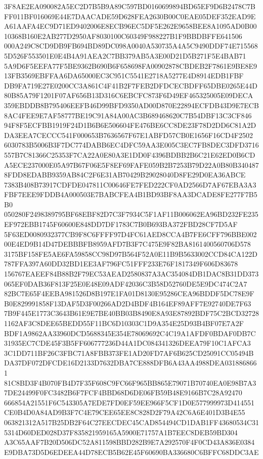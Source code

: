 \documentclass[UTF8,fontset=fandol,zihao=-4,a4paper]{ctexart}
\begin{document}
{{3F8AE2EA090082A5EC2D7B5B9A89C597BD0160699894BD65EF9D6B2478C7BFF011BF016069E44E7DAACADE59D628FEA2630B00C0EAE05DEF352EAD9E
A61AAFA4EC9D71ED9402006E8ECB96EC5DF5E262E9658BEE8A1095AD0B0010368B160E2AB277D2950AF8030100C60349F988227B1F9BBDBFFE641506
000A249C8CD9DB9FB694BD89DC098A0040A530735A4A5C9490DDF74E7155685D526F553501E0E4B4A91AEA2C7BB379AB5A3E00D21D5B271F5E4BAB71
5A9D6F5EEFA77F5BE9362B690B6F658698FA00902878CBDEB2F7861E9BE8E913FB3569EBFFAA6DA65000EC3C951C5541E2718A5277E4D8914EDB1FBF
DB9FA719E27E0200CC3A861C4F41B2F7FEB2DFDCECBDFF65DBE0265E44D80B85A79F1201F07AF656B13D316C6EBCFC873F6D49EF465325005E09DECA
359EBDDB8B795406EEFB46D99BFD9350AD00D870E22894ECFDB43D9E7ECB8AC4FEE9E7AF58777BE19C91A84A00AC3B689468620C7B54DBF13C3CF846
94F8F5ECFBB1919F24D1B6B6E506604FE476BE6CC8DE23F78D2DD6C81A2DDA3EEA7CECCC541F000653B7636567F67E1ABFD57CB0E1656F16CD4F2502
6030783B5006B3F7DC774DABB6EC4DFC59AA3E005C3EC7FB8DEC3DFD3716557B7C81366C25353F7CA22A0E80A3E1DD0F4396BDBB2B6C21E62ED0B6CD
A5ECE237000E05A97B67F06E5F8EF69FAFE059B2B7253B79D22A0B80B3404878FDD8EDABB9359AB84C2F6E31AB70429B29028040D8FE29D0EA36ABCE
7383B408B73917CDFDE047811C00646FE7FED222CF0AD2566D7AF67EBA3A3FBF7EEE9FDDB4A000503E7BABCFEA4B1BD93BF8AA3DCADE8FE277F7B5B0
050280F2498389795BF68EBF82D7C3F7934C5F1AF11B006062EA96BD232FE235EF972EBB1745F60600E848DD7DF1783C7B0B693BA372FBD28CF7D5AF
5F63ED0080932377CB9F8C6FFFF97D4FC61AED8CCA4B7FE6CFF796BBE00200E4ED9B14D47DEBBBFB8959AFD7B3F7C475E9F82BA8161400560706D578
3175BF158FE5AE6FA59858CC98D97B564F52A0E11B9B5633002CCD84CA122D787FFA397A60DD32BD1EE3AF796FC51FFF233E76F1817349F606D83678
156767EAEEF84B88B2F79EC53AEAD2580837A3AC354084DB1DAC8B31DD373065EF0DAB36F813F25E0E48E09ADF42036C3B58D52760DE5E9DC474C2A7
82BC7E65F4EEBA981526D8B197E1FA01D8130E95286CEA96BDDF5DC78E9FB0E829991858F13DAF5D3F00266AD2D4BDF4B164EF89AFF7E92740DE7F63
7B9F445E1773C3643B61E9E7BE40BB03B8490E8A93E87892BDF75C2BCD327281162AF3C8DEE65BEDD55F11BC6D10303C1D9A354E25D93B4BF07E7A2F
BDF1A9862AA33960DCD5688345E354E78069692C4C19A1AFDF0BDAF0DB7C31935EC7CDE45F3B5FF606777236D44A1DC084341326DEEA79F10C1AFCA3
3C1DD711BF26C3FBC71A8FBB373FE1AD20FD7AF6B625CD25091CC05494BDA37DF072DFCDE16D2133D7632DBA7CE888DFB6A43AA4988DEA0318868661
81C8BD3F4B070FB4D7F35F608C9FC66F965BB865E79071B70740EA0E98B7A37DE24499F0FC3482B6F7FCF4BBD68D6DE06FB59B48E9166B7C28A92470
666854A21551F6C543305A7EDE7FD0EF59EE966F5CF1D0E577999973D414551CE0B4D0A84AD9B3F7C4E79CEE65EE8C828D2F79A42C6A6E401D3B4E55
063821312A517B25DB2F64C27EECDEC45CAD854494CD1DAB1FF43680534C315314D60DED028D37F835821959165A5900E71757A1B7EEC8DEB59BD304
A3C65AAF7B20D506DC52A811598BBD282B9E7A292570F4F0CD43A836E0384E9DBA73D5D6EDEEA44D78ECB5B62E45F60690BA336680C6BFFC68DDC3AE
}}
\end{document}
